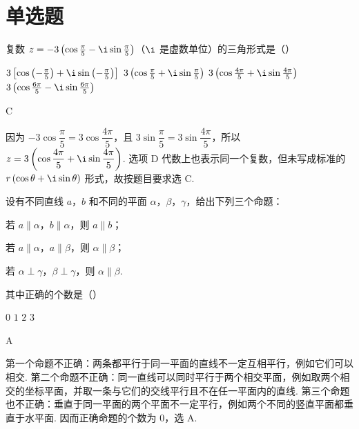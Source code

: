\section{单选题}

\begin{problem}
复数 \(z = -3\left(\cos \frac{\pi}{5} - \i\sin \frac{\pi}{5}\right)\)（\(\i\) 是虚数单位）的三角形式是（\quad）

\choices
    {\(3\left[\cos \left(-\frac{\pi}{5}\right) + \i\sin \left(-\frac{\pi}{5}\right)\right]\)}
    {\(3\left(\cos\frac{\pi}{5}+\i\sin\frac{\pi}{5}\right)\)}
    {\(3\left(\cos\frac{4\pi}{5}+\i\sin\frac{4\pi}{5}\right)\)}
    {\(3\left(\cos \frac{6\pi}{5} -\i\sin \frac{6\pi}{5}\right)\)}
\end{problem}

\begin{answer}
C
\end{answer}

\begin{solution}
因为 \(-3\cos\dfrac{\pi}{5}=3\cos\dfrac{4\pi}{5}\)，且 \(3\sin\dfrac{\pi}{5}=3\sin\dfrac{4\pi}{5}\)，所以
\(z=3\left(\cos\dfrac{4\pi}{5}+\i\sin\dfrac{4\pi}{5}\right)\). 选项 D 代数上也表示同一个复数，但未写成标准的 \(r\left(\cos\theta+\i\sin\theta\right)\) 形式，故按题目要求选 C.
\end{solution}

\begin{problem}
设有不同直线 \(a\)，\(b\) 和不同的平面 \(\alpha\)，\(\beta\)，\(\gamma\)，给出下列三个命题：
\begin{circlelist}
\item 若 \(a \parallel \alpha\)，\(b \parallel \alpha\)，则 \(a \parallel b\)；
\item 若 \(a \parallel \alpha\)，\(a \parallel \beta\)，则 \(\alpha \parallel \beta\)；
\item 若 \(\alpha \perp \gamma\)，\(\beta \perp \gamma\)，则 \(\alpha \parallel \beta\).
\end{circlelist}
其中正确的个数是（\quad）

\choices
    {\(0\)}
    {\(1\)}
    {\(2\)}
    {\(3\)}
\end{problem}

\begin{answer}
A
\end{answer}

\begin{solution}
第一个命题不正确：两条都平行于同一平面的直线不一定互相平行，例如它们可以相交. 第二个命题不正确：同一直线可以同时平行于两个相交平面，例如取两个相交的坐标平面，并取一条与它们的交线平行且不在任一平面内的直线. 第三个命题也不正确：垂直于同一平面的两个平面不一定平行，例如两个不同的竖直平面都垂直于水平面. 因而正确命题的个数为 \(0\)，选 A.
\end{solution}

